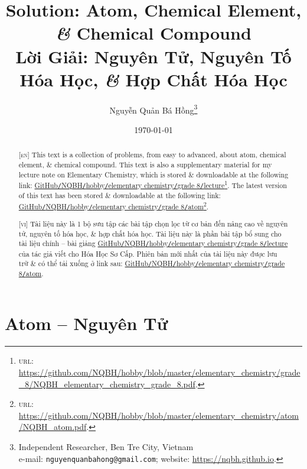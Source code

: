 \documentclass{article}
\title{Solution: Atom, Chemical Element, \textit{\&} Chemical Compound\\Lời Giải: Nguyên Tử, Nguyên Tố Hóa Học, \textit{\&} Hợp Chất Hóa Học}
\author{Nguyễn Quản Bá Hồng\footnote{Independent Researcher, Ben Tre City, Vietnam\\e-mail: \texttt{nguyenquanbahong@gmail.com}; website: \url{https://nqbh.github.io}.}}
\date{\today}
\begin{document}
\maketitle
\begin{abstract}
	\textsc{[en]} This text is a collection of problems, from easy to advanced, about atom, chemical element, \& chemical compound. This text is also a supplementary material for my lecture note on Elementary Chemistry, which is stored \& downloadable at the following link: \href{https://github.com/NQBH/hobby/blob/master/elementary_chemistry/grade_8/NQBH_elementary_chemistry_grade_8.pdf}{GitHub\texttt{/}NQBH\texttt{/}hobby\texttt{/}elementary chemistry\texttt{/}grade 8\texttt{/}lecture}\footnote{\textsc{url}: \url{https://github.com/NQBH/hobby/blob/master/elementary_chemistry/grade_8/NQBH_elementary_chemistry_grade_8.pdf}.}. The latest version of this text has been stored \& downloadable at the following link: \href{https://github.com/NQBH/hobby/blob/master/elementary_chemistry/chemical_reaction/NQBH_chemical_reaction.pdf}{GitHub\texttt{/}NQBH\texttt{/}hobby\texttt{/}elementary chemistry\texttt{/}grade 8\texttt{/}atom}\footnote{\textsc{url}: \url{https://github.com/NQBH/hobby/blob/master/elementary_chemistry/atom/NQBH_atom.pdf}.}.
	\vspace{2mm}
	
	\textsc{[vi]} Tài liệu này là 1 bộ sưu tập các bài tập chọn lọc từ cơ bản đến nâng cao về nguyên tử, nguyên tố hóa học, \& hợp chất hóa học. Tài liệu này là phần bài tập bổ sung cho tài liệu chính -- bài giảng \href{https://github.com/NQBH/hobby/blob/master/elementary_chemistry/grade_8/NQBH_elementary_chemistry_grade_8.pdf}{GitHub\texttt{/}NQBH\texttt{/}hobby\texttt{/}elementary chemistry\texttt{/}grade 8\texttt{/}lecture} của tác giả viết cho Hóa Học Sơ Cấp. Phiên bản mới nhất của tài liệu này được lưu trữ \& có thể tải xuống ở link sau: \href{https://github.com/NQBH/hobby/blob/master/elementary_chemistry/grade_8/real/NQBH_real.pdf}{GitHub\texttt{/}NQBH\texttt{/}hobby\texttt{/}elementary chemistry\texttt{/}grade 8\texttt{/}atom}.
\end{abstract}
\setcounter{secnumdepth}{4}
\setcounter{tocdepth}{3}
\tableofcontents
\newpage


\section{Atom -- Nguyên Tử}
\end{document}
